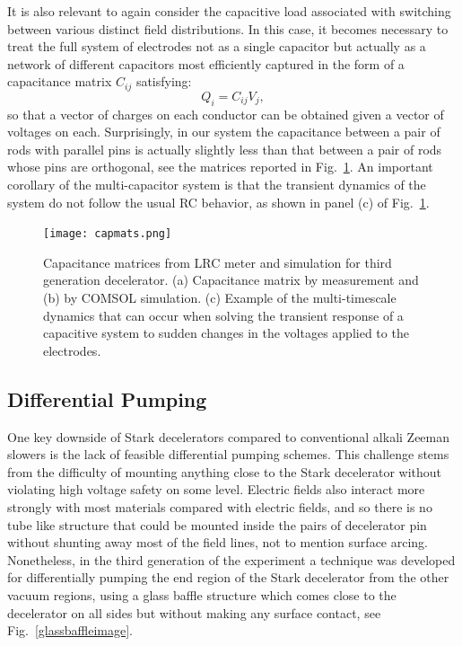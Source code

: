 It is also relevant to again consider the capacitive load associated with switching between various distinct field distributions.
In this case, it becomes necessary to treat the full system of electrodes not as a single capacitor but actually as a network of different capacitors most efficiently captured in the form of a capacitance matrix $C_{ij}$ satisfying:
\begin{equation}
Q_i = C_{ij}V_j,
\end{equation}
so that a vector of charges on each conductor can be obtained given a vector of voltages on each.
Surprisingly, in our system the capacitance between a pair of rods with parallel pins is actually slightly less than that between a pair of rods whose pins are orthogonal, see the matrices reported in Fig.~\ref{capmat}.
An important corollary of the multi-capacitor system is that the transient dynamics of the system do not follow the usual RC behavior, as shown in panel (c) of Fig.~\ref{capmat}.

\begin{figure}[t!]
\centering
\texttt{[image: capmats.png]}
\caption[Capacitance Matrix for Third Generation Decelerator]{\label{capmat}
Capacitance matrices from LRC meter and simulation for third generation decelerator. (a) Capacitance matrix by measurement and (b) by COMSOL simulation. (c) Example of the multi-timescale dynamics that can occur when solving the transient response of a capacitive system to sudden changes in the voltages applied to the electrodes.
}
\end{figure}

\subsection{Differential Pumping}

One key downside of Stark decelerators compared to conventional alkali Zeeman slowers is the lack of feasible differential pumping schemes.
This challenge stems from the difficulty of mounting anything close to the Stark decelerator without violating high voltage safety on some level.
Electric fields also interact more strongly with most materials compared with electric fields, and so there is no tube like structure that could be mounted inside the pairs of decelerator pin without shunting away most of the field lines, not to mention surface arcing.
Nonetheless, in the third generation of the experiment a technique was developed for differentially pumping the end region of the Stark decelerator from the other vacuum regions, using a glass baffle structure which comes close to the decelerator on all sides but without making any surface contact, see Fig.~\ref{glassbaffleimage}.

